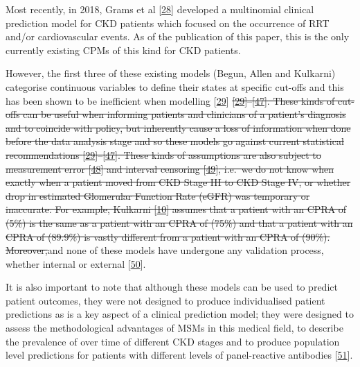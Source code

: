 \documentclass[
]{article}
\begin{document}
Most recently, in 2018, Grams et al {[}\protect\hyperlink{ref-grams_predicting_2018}{28}{]} developed a multinomial clinical prediction model for CKD patients which focused on the occurrence of RRT and/or cardiovascular events. As of the publication of this paper, this is the only currently existing CPMs of this kind for CKD patients.

However, the first three of these existing models (Begun, Allen and Kulkarni) categorise continuous variables to define their states at specific cut-offs and this has been shown to be inefficient when modelling {[}\protect\hyperlink{ref-royston_dichotomizing_2006}{29}{]} \sout{{[}\protect\hyperlink{ref-royston_dichotomizing_2006}{29}{]}--{[}\protect\hyperlink{ref-weinberg_how_1995}{47}{]}. These kinds of cut-offs can be useful when informing patients and clinicians of a patient's diagnosis and to coincide with policy, but inherently cause a loss of information when done before the data analysis stage and so these models go against current statistical recommendations {[}\protect\hyperlink{ref-royston_dichotomizing_2006}{29}{]}--{[}\protect\hyperlink{ref-weinberg_how_1995}{47}{]}. These kinds of assumptions are also subject to measurement error {[}\protect\hyperlink{ref-van_smeden_reflection_2019}{48}{]} and interval censoring {[}\protect\hyperlink{ref-sun_interval_2005}{49}{]}, i.e.~we do not know when exactly when a patient moved from CKD Stage III to CKD Stage IV, or whether drop in estimated Glomerular Function Rate (eGFR) was temporary or inaccurate. For example, Kulkarni {[}\protect\hyperlink{ref-kulkarni_transition_2017}{10}{]} assumes that a patient with an CPRA of (5\%) is the same as a patient with an CPRA of (75\%) and that a patient with an CPRA of (89.9\%) is vastly different from a patient with an CPRA of (90\%). Moreover,}and none of these models have undergone any validation process, whether internal or external {[}\protect\hyperlink{ref-altman_prognosis_2009}{50}{]}.

It is also important to note that although these models can be used to predict patient outcomes, they were not designed to produce individualised patient predictions as is a key aspect of a clinical prediction model; they were designed to assess the methodological advantages of MSMs in this medical field, to describe the prevalence of over time of different CKD stages and to produce population level predictions for patients with different levels of panel-reactive antibodies {[}\protect\hyperlink{ref-royston_prognosis_2009}{51}{]}.
\end{document}
